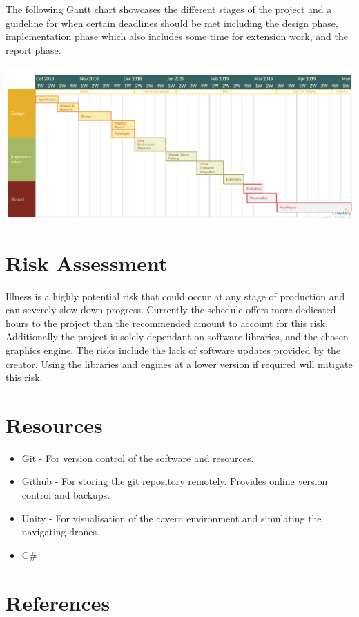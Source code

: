 \documentclass{article}
\begin{document}
The following Gantt chart showcases the different stages of the project and a guideline for when certain deadlines should be met including the design phase, implementation phase which also includes some time for extension work, and the report phase.

\includegraphics[scale=0.22]{timetable.png}

\section{Risk Assessment}
Illness is a highly potential risk that could occur at any stage of production and can severely slow down progress. Currently the schedule offers more dedicated hours to the project than the recommended amount to account for this risk. Additionally the project is solely dependant on software libraries, and the chosen graphics engine. The risks include the lack of software updates provided by the creator. Using the libraries and engines at a lower version if required will mitigate this risk.

\section{Resources}

\begin{itemize}
    \item Git - For version control of the software and resources.
    \item Github - For storing the git repository remotely. Provides online version control and backups.
    \item Unity - For visualisation of the cavern environment and simulating the navigating drones.
    \item C\#
\end{itemize}

\section{References}
\end{document}
